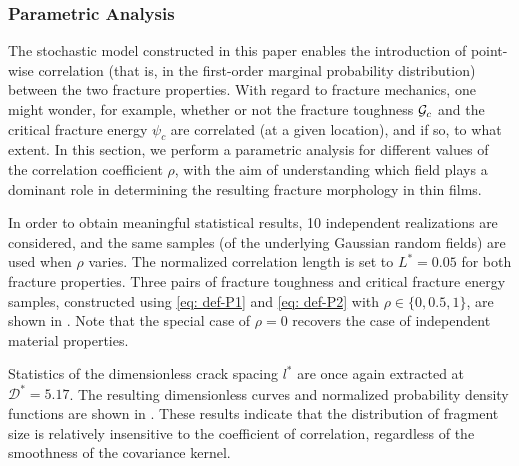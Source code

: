 \subsubsection{Parametric Analysis}

The stochastic model constructed in this paper enables the introduction of point-wise correlation (that is, in the first-order marginal probability distribution) between the two fracture properties.
With regard to fracture mechanics, one might wonder, for example, whether or not the fracture toughness ${\mathcal{G}_c}$ and the critical fracture energy $\psi_c$ are correlated (at a given location), and if so, to what extent. In this section, we perform a parametric analysis for different values of the correlation coefficient $\rho$, with the aim of understanding which field plays a dominant role in determining the resulting fracture morphology in thin films.

In order to obtain meaningful statistical results, 10 independent realizations are considered, and the same samples (of the underlying Gaussian random fields) are used when $\rho$ varies. The normalized correlation length is set to $L^* = 0.05$ for both fracture properties.
Three pairs of fracture toughness and critical fracture energy samples, constructed using \eqref{eq: def-P1} and \eqref{eq: def-P2} with $\rho \in \{0, 0.5, 1\}$, are shown in . Note that the special case of $\rho = 0$ recovers the case of independent material properties.



Statistics of the dimensionless crack spacing $l^*$ are once again extracted at $\mathcal{D}^* = 5.17$. The resulting dimensionless curves and normalized probability density functions are shown in . These results indicate that the distribution of fragment size is relatively insensitive to the coefficient of correlation, regardless of the smoothness of the covariance kernel.



